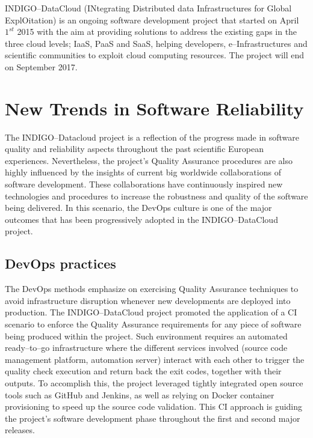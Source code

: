 \documentclass[journal]{IEEEtran}
\begin{document}
INDIGO--DataCloud (INtegrating Distributed data Infrastructures for Global ExplOitation) \cite{cordis:indigo} is an ongoing software development project that started on April $1^{st}$ 2015 with the aim at providing solutions to address the existing gaps in the three cloud levels; IaaS, PaaS and SaaS, helping developers, e--Infrastructures and scientific communities to exploit cloud computing resources. The project will end on September 2017.

\section{New Trends in Software Reliability}

The INDIGO--Datacloud project is a reflection of the progress made in software quality and reliability aspects throughout the past scientific European experiences. Nevertheless, the project’s Quality Assurance procedures are also highly influenced by the insights of current big worldwide collaborations of software development. These collaborations have continuously inspired new technologies and procedures to increase the robustness and quality of the software being delivered. In this scenario, the DevOps culture is one of the major outcomes that has been progressively adopted in the INDIGO--DataCloud project.

\subsection{DevOps practices}

The DevOps methods emphasize on exercising Quality Assurance techniques to avoid infrastructure disruption whenever new developments are deployed into production. The INDIGO--DataCloud project promoted the application of a CI scenario to enforce the Quality Assurance requirements for any piece of software being produced within the project. Such environment requires an automated ready--to--go infrastructure where the different services involved (source code management platform, automation server) interact with each other to trigger the quality check execution and return back the exit codes, together with their outputs. To accomplish this, the project leveraged tightly integrated open source tools such as GitHub and Jenkins, as well as relying on Docker container provisioning to speed up the source code validation. This CI approach is guiding the project’s software development phase throughout the first and second major releases.
\end{document}
